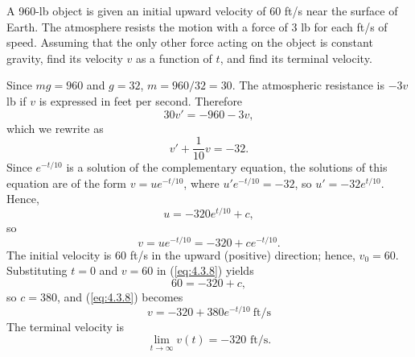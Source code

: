 \documentclass{ximera}
\begin{document}
\begin{example}\label{example:4.3.2}
A 960-lb object is given an initial upward velocity of 60 ft/s near
the surface of Earth. The atmosphere resists the motion with a force
of 3 lb for each ft/s of speed. Assuming that the only other force
acting on the object is constant gravity, find its velocity $v$ as a
function of $t$, and find its  terminal velocity.
 
\begin{explanation}
Since $mg=960$ and $g=32$,   $m=960/32=30$.  The atmospheric
resistance is $-3v$  lb if $v$ is expressed in feet
per second.  Therefore
$$
30v'=-960-3v,
$$
which we rewrite as
$$
v'+\frac{1}{10}v=-32.
$$
Since $e^{-t/10}$ is a solution of the complementary equation, the
solutions of this equation are of the form $v=ue^{-t/10}$, where
$u'e^{-t/10}=-32$, so $u'=-32e^{t/10}$. Hence,
$$
u=-320 e^{t/10}+c,
$$
so
\begin{equation} \label{eq:4.3.8}
v=ue^{-t/10}=-320+ce^{-t/10}.
\end{equation}
The initial velocity is 60 ft/s in the upward (positive) direction;
hence, $v_0=60$. Substituting $t=0$ and $v=60$ in (\ref{eq:4.3.8})
yields
$$
60=-320+c,
$$
 so $c=380$, and (\ref{eq:4.3.8}) becomes
$$
v=-320+380e^{-t/10}\ \mbox{ft/s}
$$
The terminal velocity is
$$
\lim_{t\to\infty}v(t)=-320\mbox{ ft/s.}
$$
\end{explanation}
\end{example}
\end{document}
